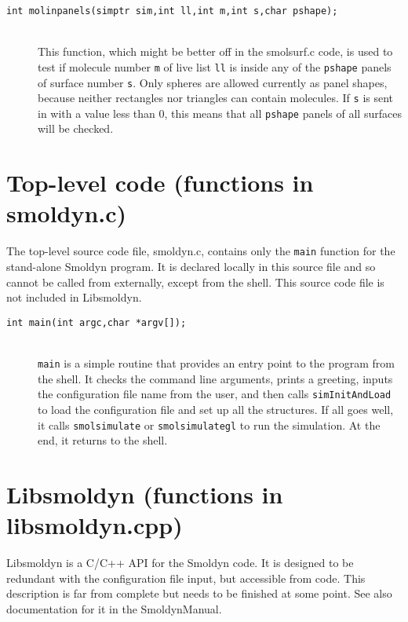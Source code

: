 \documentclass {scrbook}
\newcommand {\ttt} {\texttt}
\begin{document}
\begin{description}
\item[\ttt{int molinpanels(simptr sim,int ll,int m,int s,char pshape);}]
\hfill \\
This function, which might be better off in the smolsurf.c code, is used to test if molecule number \ttt{m} of live list \ttt{ll} is inside any of the \ttt{pshape} panels of surface number \ttt{s}. Only spheres are allowed currently as panel shapes, because neither rectangles nor triangles can contain molecules. If \ttt{s} is sent in with a value less than 0, this means that all \ttt{pshape} panels of all surfaces will be checked.

\end{description}

\section{Top-level code (functions in smoldyn.c)}

The top-level source code file, smoldyn.c, contains only the \ttt{main} function for the stand-alone Smoldyn program. It is declared locally in this source file and so cannot be called from externally, except from the shell. This source code file is not included in Libsmoldyn.

\begin{description}

\item[\ttt{int main(int argc,char *argv[]);}]
\hfill \\
\ttt{main} is a simple routine that provides an entry point to the program from the shell. It checks the command line arguments, prints a greeting, inputs the configuration file name from the user, and then calls \ttt{simInitAndLoad} to load the configuration file and set up all the structures. If all goes well, it calls \ttt{smolsimulate} or \ttt{smolsimulategl} to run the simulation. At the end, it returns to the shell.

\end{description}

\section{Libsmoldyn (functions in libsmoldyn.cpp)}

Libsmoldyn is a C/C++ API for the Smoldyn code. It is designed to be redundant with the configuration file input, but accessible from code. This description is far from complete but needs to be finished at some point. See also documentation for it in the SmoldynManual.
\end{document}
